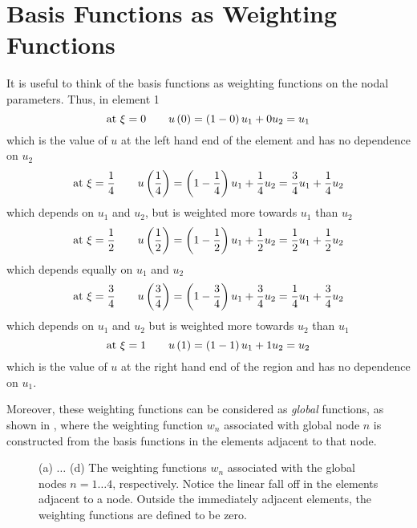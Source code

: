 \section{Basis Functions as Weighting Functions}

It is useful to think of the basis functions as weighting functions on the
nodal parameters.  Thus, in element 1
\begin{equation*}
  \text{at } \xi=0 \qquad  u\left( 0 \right)  = \left( 1-0 \right)u_{1} + 0u_{2} = u_{1}
\end{equation*}
which is the value of $u$ at the left hand end of the element and has no
dependence on $u_{2}$
\begin{equation*}
  \text{at } \xi=\frac14 \qquad    u\left( \frac14 \right)  = \left( 1-\frac14 \right) u_{1} +
  \frac14 u_{2} = \frac34 u_{1}+\frac14 u_{2}
\end{equation*}
which depends on $u_{1}$ and $u_{2}$, but is weighted more towards $u_{1}$
than $u_{2}$
\begin{equation*}
  \text{at } \xi=\frac12 \qquad  u\left( \frac12 \right)  = \left( 1-\frac12 \right) u_{1}+
  \frac12 u_{2} = \frac12 u_{1}+\frac12 u_{2}
\end{equation*}
which depends equally on $u_{1}$ and $ u_{2}$
\begin{equation*}
  \text{at } \xi=\frac34   \qquad  u\left( \frac34 \right)  = \left( 1-\frac34 \right) u_{1}
  + \frac34 u_{2} = \frac14 u_{1}+\frac34 u_{2}
\end{equation*}
which depends on $u_{1}$ and $u_{2}$ but is weighted more towards $u_{2}$
than $u_{1}$
\begin{equation*}
    \text{at } \xi=1   \qquad  u\left( 1 \right)  = \left( 1- 1 \right)u_{1} +{1}u_{2} = u_{2}
\end{equation*}
which is the value of $u$ at the right hand end of the region and has no
dependence on $u_{1}$.

Moreover, these weighting functions can be considered as \emph{global} 
functions, as shown in , where the weighting function
$w_{n}$ associated with global node $n$ is constructed from the basis functions 
in the elements adjacent to that node.

\begin{figure}[htbp] \centering
  
  \caption{(a) $\ldots$ (d) The weighting functions $w_{n}$ associated with 
    the global nodes $n=1\ldots4$, respectively. Notice the linear fall off 
    in the elements adjacent to a node.  Outside the immediately adjacent 
    elements, the weighting functions are defined to be zero.}
  \label{fig:Weighting}
\end{figure}

